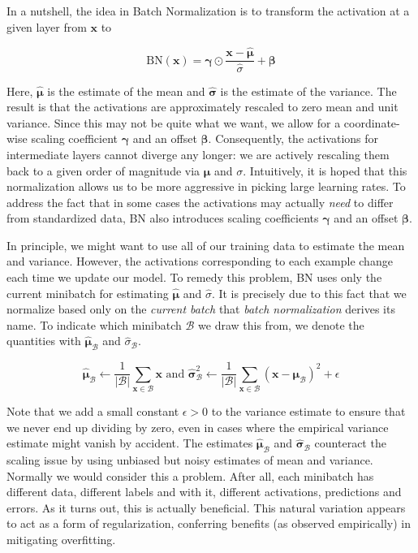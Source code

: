 In a nutshell, the idea in Batch Normalization is  to transform the activation at a given layer from $\mathbf{x}$ to

$$\mathrm{BN}(\mathbf{x}) = \mathbf{\gamma} \odot \frac{\mathbf{x} - \hat{\mathbf{\mu}}}{\hat\sigma} + \mathbf{\beta}$$

Here, $\hat{\mathbf{\mu}}$ is the estimate of the mean and $\hat{\mathbf{\sigma}}$ is the estimate of the variance. 
The result is that the activations are approximately rescaled to zero mean and unit variance. Since this may not be quite what we want, we allow for a coordinate-wise scaling coefficient $\mathbf{\gamma}$ and an offset $\mathbf{\beta}$. Consequently, the activations for intermediate layers cannot diverge any longer: we are actively rescaling them back to a given order of magnitude via $\mathbf{\mu}$ and $\sigma$. Intuitively, it is hoped that this normalization allows us to be more aggressive in picking large learning rates. To address the fact that in some cases the activations may actually \textit{need} to differ from standardized data, BN also introduces scaling coefficients $\mathbf{\gamma}$ and an offset $\mathbf{\beta}$.

In principle, we might want to use all of our training data to estimate the mean and variance. However, the activations corresponding to each example change each time we update our model. To remedy this problem, BN uses only the current minibatch for estimating $\hat{\mathbf{\mu}}$ and $\hat\sigma$. It is precisely due to this fact that we normalize based only on the \textit{current batch}
that \textit{batch normalization} derives its name. To indicate which minibatch $\mathcal{B}$ we draw this from, we denote the quantities with $\hat{\mathbf{\mu}}_\mathcal{B}$ and $\hat\sigma_\mathcal{B}$.

$$\hat{\mathbf{\mu}}_\mathcal{B} \leftarrow \frac{1}{|\mathcal{B}|} \sum_{\mathbf{x} \in \mathcal{B}} \mathbf{x}
\text{ and }
\hat{\mathbf{\sigma}}_\mathcal{B}^2 \leftarrow \frac{1}{|\mathcal{B}|} \sum_{\mathbf{x} \in \mathcal{B}} (\mathbf{x} - \mathbf{\mu}_{\mathcal{B}})^2 + \epsilon$$

Note that we add a small constant $\epsilon > 0$ to the variance estimate to ensure that we never end up dividing by zero, 
even in cases where the empirical variance estimate might vanish by accident. The estimates $\hat{\mathbf{\mu}}_\mathcal{B}$ 
and $\hat{\mathbf{\sigma}}_\mathcal{B}$ counteract the scaling issue by using unbiased but noisy estimates of mean and variance. 
Normally we would consider this a problem. After all, each minibatch has different data, different labels and with it, different activations, predictions and errors. As it turns out, this is actually beneficial. This natural variation appears to act as a form of regularization, conferring benefits (as observed empirically) in mitigating overfitting. 

